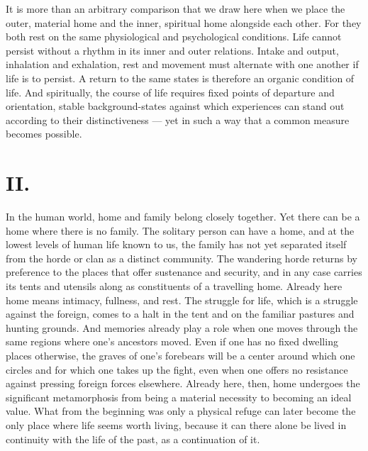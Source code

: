 \documentclass[12pt,a4paper]{article}
\newcommand{\opage}[1]{\marginnote{\footnotesize\textit{[#1]}}}
\begin{document}
It is more than an arbitrary comparison that we draw here when we
place the outer, material home and the inner, spiritual home alongside
each other. For they both rest on the same physiological and
psychological conditions. Life cannot persist without a rhythm in its
inner and outer relations. Intake and output, inhalation and
exhalation, rest and movement must alternate with one another if life
is to persist. A return to the same states is therefore an organic
condition of life. And spiritually, the course of life requires fixed
points of departure and orientation, stable background-states against
which experiences can stand out according to their distinctiveness --- yet in
such a way that a common measure becomes possible.

\section*{II.}

\noindent In the human world, home and family belong closely together.
Yet there can be a home where there is no family. The solitary person
can have a home, and at the lowest levels of human life known to us,
the family has not yet separated itself from the horde or clan as a
distinct community. The wandering horde returns by preference to the
places that offer sustenance and security, and in any case carries its
tents and utensils along as constituents of a travelling home. Already
here home means intimacy, fullness, and rest. The struggle for life,
which is a struggle against the foreign, comes to a halt in the tent
and on the familiar pastures and hunting grounds. And memories
already play a role when one moves through the same regions where
one's ancestors moved. Even if one has no fixed dwelling places
otherwise, \opage{5}the graves of one's forebears will be a center around which
one circles and for which one takes up the fight, even when one offers
no resistance against pressing foreign forces elsewhere. Already here,
then, home undergoes the significant metamorphosis from being a
material necessity to becoming an ideal value. What from the beginning
was only a physical refuge can later become the only place where life
seems worth living, because it can there alone be lived in continuity
with the life of the past, as a continuation of it.
\end{document}
